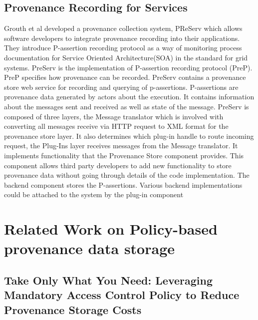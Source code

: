 \subsection{Provenance Recording for Services}
Grouth et al \cite{groth} developed a provenance collection system, PReServ which allows software developers to integrate provenance recording into their applications. They introduce P-assertion recording protocol as a way of monitoring process  documentation for Service Oriented Architecture(SOA) in the standard for grid systems. PreServ is the implementation of P-assertion recording protocol (PreP). PreP specifies how provenance can be recorded. PreServ contains a provenance store web service for recording and querying of p-assertions. P-assertions are provenance data generated by actors about the execution. It contains information about the messages sent and received as well as state of the message. PreServ is composed of three layers, the Message translator which is involved with converting all messages receive via HTTP request to XML format for the provenance store layer. It also determines which plug-in handle to route incoming request, the  Plug-Ins layer receives messages from the Message translator. It implements functionality that the Provenance Store component provides. This component allows third party developers to add new functionality to store provenance data without going through details of the code implementation. The backend component stores the P-assertions. Various backend implementations could be attached to the system by the plug-in component


\section{Related Work on Policy-based provenance data storage}

\subsection{Take Only What You Need: Leveraging Mandatory Access Control Policy to Reduce Provenance Storage Costs}

